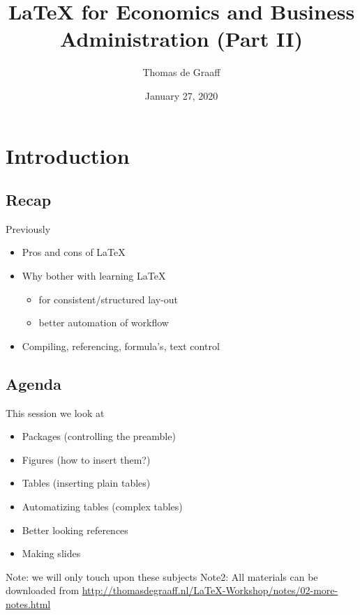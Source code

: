 \documentclass[ignorenonframetext]{beamer}
\title{\LaTeX{} for Economics and Business Administration (Part II)}
\author{Thomas de Graaff}
\date{January 27, 2020}
\begin{document}
\frame{\titlepage}

\section{Introduction}\label{introduction}

\subsection{Recap}\label{introduction-1}

\begin{frame}{Previously}
	\begin{itemize}
		\item Pros and cons of \LaTeX{}
		\newline
		\item Why bother with learning \LaTeX{}
		\begin{itemize}
			\item for consistent/structured lay-out
			\item better automation of workflow
			\newline
		\end{itemize}
		\item Compiling, referencing, formula's, text control
	\end{itemize}
\end{frame}

\subsection{Agenda}

\begin{frame}{This session we look at}
\begin{itemize}
	\item Packages (controlling the preamble)
	\item Figures (how to insert them?)
	\item Tables (inserting plain tables)
	\item Automatizing tables (complex tables)
	\item Better looking references
	\item Making slides
\end{itemize}
	Note: we will only touch upon these subjects
	Note2: All materials can be downloaded from \href{http://thomasdegraaff.nl/LaTeX-Workshop/notes/02-more-notes.html}{http://thomasdegraaff.nl/LaTeX-Workshop/notes/02-more-notes.html}
\end{frame}
\end{document}
